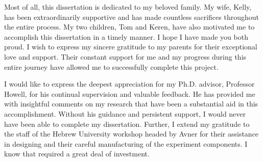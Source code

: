 \documentclass[\main/master.tex]{subfiles}
\begin{document}
Most of all, this dissertation is dedicated to my beloved family. My wife, Kelly,
has been extraordinarily supportive and has made countless sacrifices throughout the entire
process. My two children, Tom and Keren, have also motivated me to accomplish this
dissertation in a timely manner. I hope I have made you both proud. I wish to express my
sincere gratitude to my parents for their exceptional love and support. Their constant support for me and my progress during this entire journey have allowed me
to successfully complete this project. 
\par\noindent
I would like to express the deepest appreciation for my Ph.D. advisor, Professor Howell, for his continual supervision and valuable feedback. He
has provided me with insightful comments on my research that have been a substantial aid
in this accomplishment. Without his guidance and persistent support, I would never have
been able to complete my dissertation. Further, I extend my gratitude to the staff of the Hebrew University workshop headed by Avner for their assistance in designing and their careful manufacturing of the experiment components. I know that required a great deal of investment.


\par\noindent
\end{document}
